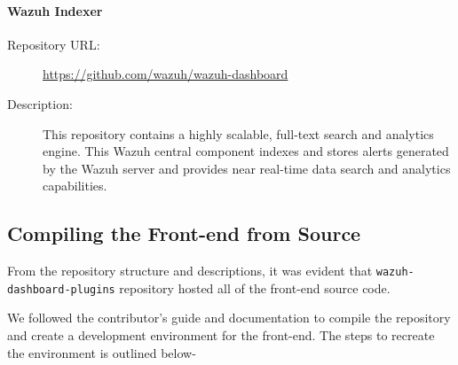 \paragraph*{Wazuh Indexer}
\begin{description}
    \item[Repository URL:] \url{https://github.com/wazuh/wazuh-dashboard}
    \item[Description:] This repository contains a highly scalable, full-text search and analytics engine. This Wazuh central component indexes and stores alerts generated by the Wazuh server and provides near real-time data search and analytics capabilities.
\end{description}

\subsection{Compiling the Front-end from Source}
From the repository structure and descriptions, it was evident that \texttt{wazuh-dashboard-plugins} repository hosted all of the front-end source code.

We followed the contributor's guide and documentation to compile the repository and create a development environment for the front-end. The steps to recreate the environment is outlined below-


